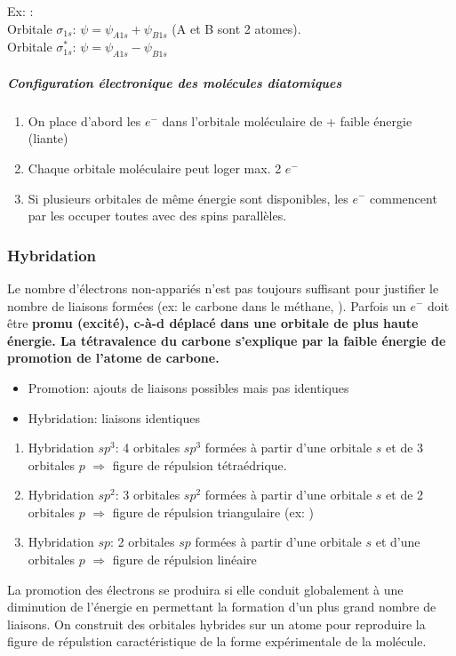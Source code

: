 \documentclass[11pt,a4paper,french]{article}
\renewcommand{\textbf}[1]{\begingroup\bfseries\mathversion{bold}#1\endgroup}
\begin{document}
Ex: : \\
Orbitale $\sigma_{1s}$: $\psi=\psi_{A1s}+\psi_{B1s}$ (A et B sont 2 atomes).\\
Orbitale $\sigma^{*}_{1s}$: $\psi=\psi_{A1s}-\psi_{B1s}$

\subparagraph{Configuration électronique des molécules diatomiques}
\begin{enumerate}
	\item On place d'abord les $e^-$ dans l'orbitale moléculaire de + faible énergie (liante)
	\item Chaque orbitale moléculaire peut loger max. 2 $e^-$
	\item Si plusieurs orbitales de même énergie sont disponibles, les $e^-$ commencent par les occuper toutes avec des spins parallèles.
\end{enumerate}

\subsubsection{Hybridation}

Le nombre d'électrons non-appariés n'est pas toujours suffisant pour justifier le nombre de liaisons formées (ex: le carbone dans le méthane, ).
Parfois un $e^-$ doit être \textbf{promu} (excité), c-à-d déplacé dans une orbitale de plus haute énergie.
La tétravalence du carbone s'explique par la faible énergie de promotion de l'atome de carbone.
\begin{itemize}
\item Promotion: ajouts de liaisons possibles mais pas identiques
\item Hybridation: liaisons identiques
\end{itemize}
\begin{enumerate}
\item Hybridation $sp^3$: 4 orbitales $sp^3$ formées à partir d'une orbitale $s$ et de 3 orbitales $p$ $\Rightarrow$ figure de répulsion tétraédrique.
\item Hybridation $sp^2$: 3 orbitales $sp^2$ formées à partir d'une orbitale $s$ et de 2 orbitales $p$ $\Rightarrow$ figure de répulsion triangulaire (ex: )
\item Hybridation $sp$: 2 orbitales $sp$ formées à partir d'une orbitale $s$ et d'une orbitales $p$ $\Rightarrow$ figure de répulsion linéaire
\end{enumerate}


La promotion des électrons se produira si elle conduit globalement à une diminution de l'énergie en permettant la formation d'un plus grand nombre de liaisons.
On construit des orbitales hybrides sur un atome pour reproduire la figure de répulstion caractéristique de la forme expérimentale de la molécule.
\end{document}
